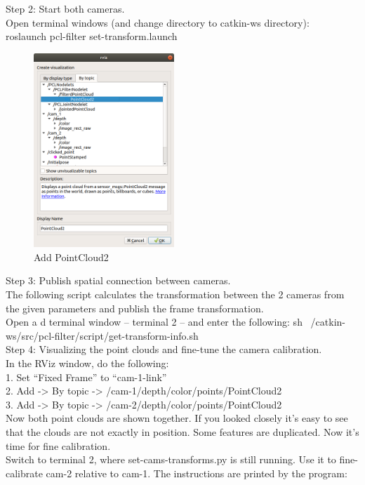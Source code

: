    
Step 2: Start both cameras.\\
Open terminal windows (and change directory to catkin-ws directory)$\colon$\\
roslaunch pcl-filter set-transform.launch\\


\begin{figure}[htp]
	\centering %
	\includegraphics[width = 5.3cm]{figures/topic}
	\caption{Add PointCloud2}
	\label{fig:figure1label}
\end{figure}

Step 3: Publish spatial connection between cameras.\\
The following script calculates the transformation between the 2 cameras from the given parameters and publish the frame transformation.\\
Open a d terminal window – terminal 2 – and enter the following: sh ~/catkin-ws/src/pcl-filter/script/get-transform-info.sh\\


Step 4: Visualizing the point clouds and fine-tune the camera calibration.\\


In the RViz window, do the following:\\
1. Set “Fixed Frame” to “cam-1-link”\\
2. Add -> By topic -> /cam-1/depth/color/points/PointCloud2\\
3. Add -> By topic -> /cam-2/depth/color/points/PointCloud2\\
Now both point clouds are shown together. If you looked closely it’s easy to see that the clouds are not exactly in position. Some features are duplicated. Now it’s time for fine calibration.\\

Switch to terminal 2, where set-cams-transforms.py is still running. Use it to fine-calibrate cam-2 relative to cam-1. The instructions are printed by the program:\\

